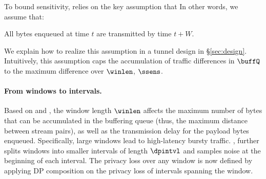 To bound sensitivity, {\sys} relies on the key assumption that
In other words, we assume that:
\begin{assumption}\label{assumption:window}
    All bytes enqueued  at time $t$ are transmitted by time
    $t+W$.
\end{assumption}
We explain how to realize this assumption in a tunnel design in
\S\ref{sec:design}.
%
Intuitively, this assumption caps the accumulation of traffic differences in
$\buffQ$ to the maximum difference over $\winlen$, \ie $\ssens$.


\paragraph{From windows to intervals.}
{Based on  and ,}
the window length $\winlen$ affects the maximum number of bytes that can be
accumulated in the buffering queue (thus, the maximum distance between stream
pairs), as well as the transmission delay for the payload bytes enqueued.
Specifically, large windows lead to high-latency bursty traffic.
, {\sys} further splits windows into
smaller intervals of length $\dpintvl$ and samples noise at the beginning of
each interval.
The privacy loss over any window is now defined by applying DP composition
on the privacy loss of intervals spanning the window.

